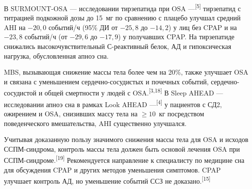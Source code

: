 \documentclass[11pt,a4paper]{article}
\newcommand{\src}[1]{\textsuperscript{[#1]}}
\begin{document}
В SURMOUNT-OSA --- исследовании тирзепатида при OSA ---\src{5} тирзепатид с титрацией подкожной дозы до 15~мг по сравнению с плацебо улучшал средний AHI на $-20{,}0$ событий/ч (95\% ДИ от $-25{,}8$ до $-14{,}2$) у лиц без CPAP и на $-23{,}8$ событий/ч (от $-29{,}6$ до $-17{,}9$) у получавших CPAP. На тирзепатиде снижались высокочувствительный С-реактивный белок, АД и гипоксическая нагрузка, обусловленная апноэ сна.

MBS, вызывающая снижение массы тела более чем на 20\%, также улучшает OSA и связана с уменьшением сердечно-сосудистых и почечных событий, сердечно-сосудистой и общей смертности у людей с OSA.\src{3,18} В Sleep AHEAD --- исследовании апноэ сна в рамках Look AHEAD ---\src{4} у пациентов с СД2, ожирением и OSA, снизивших массу тела на $\geq10$~кг посредством поведенческого вмешательства, AHI существенно улучшался.

Учитывая доказанную пользу значимого снижения массы тела для OSA и исходов ССПМ-синдрома, контроль массы тела должен быть основой лечения OSA при ССПМ-синдроме.\src{19} Рекомендуется направление к специалисту по медицине сна для обсуждения CPAP и других методов уменьшения симптомов. CPAP улучшает контроль АД, но уменьшение событий ССЗ не доказано.\src{15}
\end{document}
